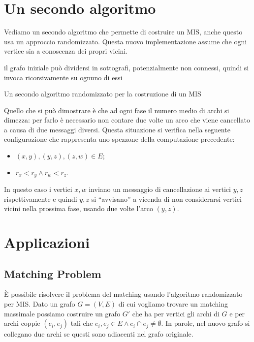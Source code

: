 \documentclass{article}
\begin{document}
\section{Un secondo algoritmo}
Vediamo un secondo algoritmo che permette di costruire un MIS, anche questo
usa un approccio randomizzato. Questa nuovo implementazione assume che ogni
vertice sia a conoscenza dei propri vicini.
\begin{algorithm}
 \SetAlgoLined
    il grafo iniziale pu\`o dividersi in sottografi, potenzialmente
    non connessi, quindi si invoca ricorsivamente su ognuno di essi
 \caption{Un secondo algoritmo randomizzato per la costruzione di un MIS}
\end{algorithm}

Quello che si pu\`o dimostrare \`e che ad ogni fase il numero medio di archi
si dimezza: per farlo \`e necessario non contare due volte un arco che
viene cancellato a causa di due messaggi diversi. Questa situazione si
verifica nella seguente configurazione che rappresenta uno spezzone della
computazione precedente:
\begin{itemize}
    \item $(x,y),(y,z),(z,w) \in E$;
    \item $r_x < r_y \wedge r_w < r_z$.
\end{itemize}
In questo caso i vertici $x,w$ inviano un messaggio di cancellazione ai vertici $
y,z$ rispettivamente e quindi $y,z$ si ``avvisano'' a vicenda di non
considerarsi vertici vicini nella prossima fase, usando due volte l'arco
$(y,z)$.

\section{Applicazioni}

\subsection{Matching Problem}
\`E possibile risolvere il problema del matching usando l'algoritmo
randomizzato per MIS. Dato un grafo $G = (V,E)$ di cui vogliamo trovare 
un matching massimale possiamo costruire un grafo $G'$ che ha per vertici
gli archi di $G$ e per archi coppie $(e_i, e_j)$ tali che $e_i, e_j \in E
\wedge e_i \cap e_j \not = \emptyset$. In parole, nel nuovo grafo si collegano
due archi se questi sono adiacenti nel grafo originale.
\end{document}
